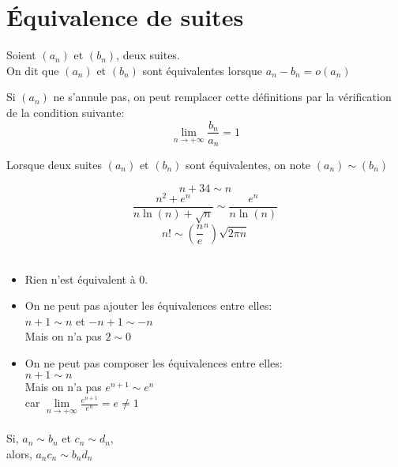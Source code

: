 \documentclass[../main.tex]{subfile}
\begin{document}
\section{Équivalence de suites}
\begin{defi}
	Soient $(a_n)$ et $(b_n)$, deux suites.\\
	On dit que $(a_n)$ et $(b_n)$ sont équivalentes lorsque $a_n - b_n = o(a_n)$\\
\end{defi}

\begin{rema}
	Si $(a_n)$ ne s'annule pas, on peut remplacer cette définitions par la vérification de la condition suivante:\\
	$$\lim\limits_{n \to + \infty} \frac{b_n}{a_n} = 1$$
\end{rema}

\begin{nota}
	Lorsque deux suites $(a_n)$ et $(b_n)$ sont équivalentes, on note $(a_n) \sim (b_n)$
\end{nota}

\begin{ex}
	$$n + 34 \sim n$$	
	$$\frac{n^2 + e^n}{n \ln(n) + \sqrt{n}} \sim \frac{e^n}{n \ln(n)}$$
	$$n! \sim \left( \frac{n}{e}^n \right) \sqrt{2 \pi n}$$
\end{ex}

\begin{rema}
$\phantom{a}$\\
	\begin{itemize}
		\item Rien n'est équivalent à 0.
		\item On ne peut pas ajouter les équivalences entre elles:\\
		$n + 1 \sim n$ et $-n + 1 \sim -n$\\
		Mais on n'a pas $2 \sim 0$
		\item On ne peut pas composer les équivalences entre elles:\\
		$n+1 \sim n$\\
		Mais on n'a pas $e^{n+1} \sim e^n$\\
		car $\lim\limits_{n \to + \infty} \frac{e^{n+1}}{e^n} = e \neq 1$
	\end{itemize}
\end{rema}

\begin{theo}
	$\phantom{a}$\\
	Si, $a_n \sim b_n$ et $c_n \sim d_n$,\\
	alors, $a_nc_n \sim b_nd_n$
\end{theo}
\end{document}
